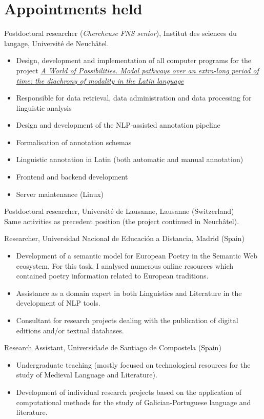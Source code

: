 \documentclass[11pt, a4paper]{article}
\newcommand{\years}[1]{\marginnote{\scriptsize #1}}
\newcommand{\ind}[1]{\textcolor{black!62!white}{\selectfont#1}}
\begin{document}
\section{Appointments held}
\noindent
\years{01/2021--02/2023}Postdoctoral researcher (\emph{Chercheuse FNS senior}), Institut des sciences du langage, Université de Neuchâtel.
\textcolor{black!62!white}{
\begin{itemize}[noitemsep,topsep=0pt]
 \item Design, development and implementation of all computer programs for the project \href{https://woposs.unine.ch/}{\textit{A World of Possibilities. Modal pathways over an extra-long period of time: the diachrony of modality in the Latin language}}
\item Responsible for data retrieval, data administration and data processing for linguistic analysis
\item Design and development of the NLP-assisted annotation pipeline 
\item Formalisation of annotation schemas
\item Linguistic annotation in Latin (both automatic and manual annotation)
\item Frontend and backend development
\item Server maintenance (Linux)
\end{itemize}}
\years{2019--2020}Postdoctoral researcher, Université de Lausanne, Lausanne (Switzerland)\\
  \ind{Same activities as precedent position (the project continued in Neuchâtel).}

\years{2017--2019}Researcher, Universidad Nacional de Educación a Distancia, Madrid (Spain)
\textcolor{black!62!white}{
\begin{itemize}[noitemsep,topsep=0pt]
 \item Development of a semantic model for European Poetry in the Semantic Web ecosystem. For this task, I analysed numerous online resources which contained poetry information related to European traditions.
 \item Assistance as a domain expert in both Linguistics and Literature in the development of NLP tools. 
 \item Consultant for research projects dealing with the publication of digital editions and/or textual databases.
 \end{itemize}
 }

\years{2012--2016}Research Assistant, Universidade de Santiago de Compostela (Spain)
\textcolor{black!62!white}{
\begin{itemize}[noitemsep,topsep=0pt]
 \item Undergraduate teaching (mostly focused on technological resources for the study of Medieval Language and Literature).
 \item Development of individual research projects based on the application of computational methods for the study of Galician-Portuguese language and literature.
 \end{itemize}
 }
 
\end{document}
